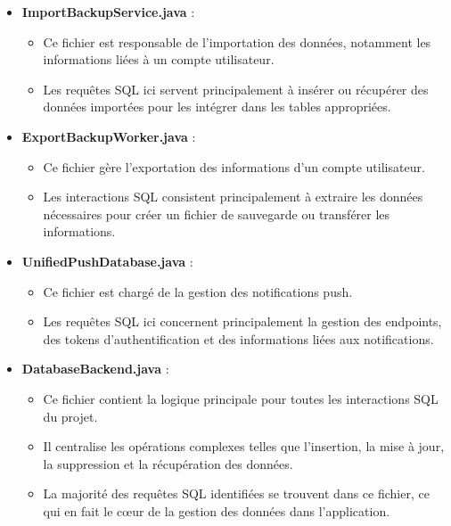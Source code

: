 \documentclass[a4paper,11pt]{article}
\begin{document}
\begin{itemize}
    \item \textbf{ImportBackupService.java} :
    \begin{itemize}
        \item Ce fichier est responsable de l'importation des données, notamment les informations liées à un compte utilisateur.
        \item Les requêtes SQL ici servent principalement à insérer ou récupérer des données importées pour les intégrer dans les tables appropriées.
    \end{itemize}

    \item \textbf{ExportBackupWorker.java} :
    \begin{itemize}
        \item Ce fichier gère l'exportation des informations d'un compte utilisateur.
        \item Les interactions SQL consistent principalement à extraire les données nécessaires pour créer un fichier de sauvegarde ou transférer les informations.
    \end{itemize}

    \item \textbf{UnifiedPushDatabase.java} :
    \begin{itemize}
        \item Ce fichier est chargé de la gestion des notifications push.
        \item Les requêtes SQL ici concernent principalement la gestion des endpoints, des tokens d'authentification et des informations liées aux notifications.
    \end{itemize}

    \item \textbf{DatabaseBackend.java} :
    \begin{itemize}
        \item Ce fichier contient la logique principale pour toutes les interactions SQL du projet.
        \item Il centralise les opérations complexes telles que l'insertion, la mise à jour, la suppression et la récupération des données.
        \item La majorité des requêtes SQL identifiées se trouvent dans ce fichier, ce qui en fait le cœur de la gestion des données dans l'application.
    \end{itemize}
\end{itemize}
\end{document}
